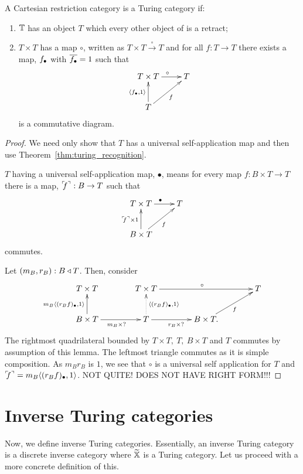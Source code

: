 \begin{lemma}\label{lem:t_t_to_t_gives_a_turing_category}
  A Cartesian restriction category \T is a Turing category if:
  \begin{enumerate}[{(}i{)}]
  \item $\mathbb{T}$ has an object $T$ which every other object of \D is a retract;
  \item $T\times T$ has a map  $\circ$, written as $T\times T \xrightarrow{\ \circ\ }T$ and for all
    $f:T\to T$ there exists a map, $f_{\bullet}$ with  $\overline{f_{\bullet}} = 1$ such that
      \[
        \xymatrix{
          T\times T \ar[r]^{\circ} & T \\
          T \ar[ur]_{f} \ar[u]^{\<\code{f},1\>}
        }
      \]
    is a commutative diagram.
  \end{enumerate}
\end{lemma}
\begin{proof}
  We need only show that $T$ has a universal self-application map and then use
  Theorem~\ref{thm:turing_recognition}.

  $T$ having a universal self-application map, $\bullet$, means for every map $f:B\times T \to T$ there is a
  map, ${}^\ulcorner\!\!f^\urcorner:B\to T$ such that
  \[
    \xymatrix{
      T\times T \ar[r]^{\bullet} & T \\
      B\times T \ar[ur]_{f} \ar[u]^{\name{f}\times1}
    }
  \]
  commutes.

  Let $(m_B,r_B):B\triangleleft T$. Then, consider
  \[
    \xymatrix@C+15pt{
     T\times T & T\times T \ar[rr]^{\circ} && T \\
      B\times T \ar[u]^{m_B\<\code{(r_Bf)},1\>} \ar[r]_{m_B\times ?}
       & T \ar[r]_{r_B \times ?} \ar@{.>}[u]_{\<\code{(r_B f)},1\>}
       & B\times T. \ar[ur]_{f}
    }
  \]
  The rightmost quadrilateral bounded by $T\times T,\ T,\ B\times T$ and $T$ commutes by assumption
  of this lemma. The leftmost triangle commutes as it is simple composition. As $m_Br_B$ is $1$, we
  see that $\circ$ is a universal self application for $T$ and ${}^\ulcorner\!\!f^\urcorner =
  m_B\langle(r_Bf)_{\bullet},1\rangle$. NOT QUITE! DOES NOT HAVE RIGHT FORM!!!
\end{proof}
\section{Inverse Turing categories}
\label{sec:inverse_turing_categories}
Now, we define inverse Turing categories. Essentially, an inverse Turing category is a discrete
inverse category \X where $\widetilde{\mathbb{X}}$ is a Turing category. Let us proceed with a more concrete
definition of this.

